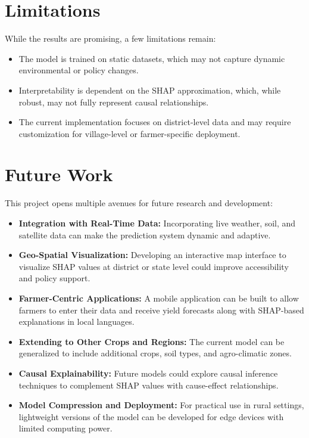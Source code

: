 \documentclass[a4paper,11pt,oneside]{book}
\begin{document}
\section{Limitations}

While the results are promising, a few limitations remain:
\begin{itemize}
    \item The model is trained on static datasets, which may not capture dynamic environmental or policy changes.
    \item Interpretability is dependent on the SHAP approximation, which, while robust, may not fully represent causal relationships.
    \item The current implementation focuses on district-level data and may require customization for village-level or farmer-specific deployment.
\end{itemize}

\section{Future Work}

This project opens multiple avenues for future research and development:

\begin{itemize}
    \item \textbf{Integration with Real-Time Data:} Incorporating live weather, soil, and satellite data can make the prediction system dynamic and adaptive.
    \item \textbf{Geo-Spatial Visualization:} Developing an interactive map interface to visualize SHAP values at district or state level could improve accessibility and policy support.
    \item \textbf{Farmer-Centric Applications:} A mobile application can be built to allow farmers to enter their data and receive yield forecasts along with SHAP-based explanations in local languages.
    \item \textbf{Extending to Other Crops and Regions:} The current model can be generalized to include additional crops, soil types, and agro-climatic zones.
    \item \textbf{Causal Explainability:} Future models could explore causal inference techniques to complement SHAP values with cause-effect relationships.
    \item \textbf{Model Compression and Deployment:} For practical use in rural settings, lightweight versions of the model can be developed for edge devices with limited computing power.
\end{itemize}
\end{document}
